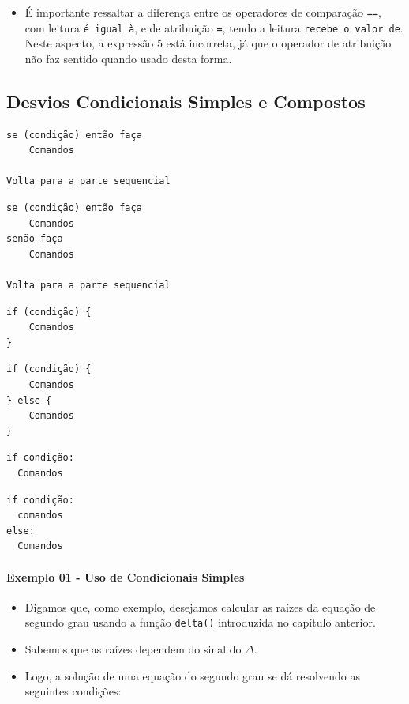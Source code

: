 \documentclass[12pt,a4paper]{article}
\providecommand{\tightlist}{%
      \setlength{\itemsep}{0pt}\setlength{\parskip}{0pt}}
\begin{document}
    \begin{itemize}
\tightlist
\item
  É importante ressaltar a diferença entre os operadores de comparação
  \texttt{==}, com leitura \texttt{é\ igual\ à}, e de atribuição
  \texttt{=}, tendo a leitura \texttt{recebe\ o\ valor\ de}. Neste
  aspecto, a expressão 5 está incorreta, já que o operador de atribuição
  não faz sentido quando usado desta forma.
\end{itemize}

    \hypertarget{desvios-condicionais-simples-e-compostos}{%
\subsection{Desvios Condicionais Simples e
Compostos}\label{desvios-condicionais-simples-e-compostos}}

    \begin{verbatim}
se (condição) então faça
    Comandos

Volta para a parte sequencial
\end{verbatim}

\begin{verbatim}
se (condição) então faça
    Comandos
senão faça
    Comandos

Volta para a parte sequencial
\end{verbatim}

    \begin{verbatim}
if (condição) {
    Comandos
}
\end{verbatim}

\begin{verbatim}
if (condição) {
    Comandos
} else {
    Comandos
}
\end{verbatim}

    \begin{verbatim}
if condição:
  Comandos
\end{verbatim}

\begin{verbatim}
if condição:
  comandos
else:
  Comandos
\end{verbatim}

    \hypertarget{exemplo-01---uso-de-condicionais-simples}{%
\paragraph{Exemplo 01 - Uso de Condicionais
Simples}\label{exemplo-01---uso-de-condicionais-simples}}

    \begin{itemize}
\item
  Digamos que, como exemplo, desejamos calcular as raízes da equação de
  segundo grau usando a função \texttt{delta()} introduzida no capítulo
  anterior.
\item
  Sabemos que as raízes dependem do sinal do \(\Delta\).
\item
  Logo, a solução de uma equação do segundo grau se dá resolvendo as
  seguintes condições:
\end{itemize}
\end{document}
